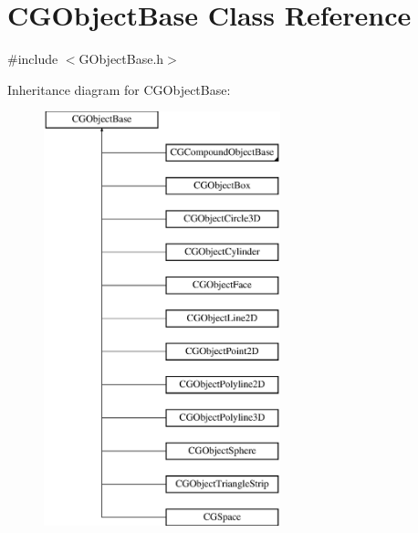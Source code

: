\hypertarget{class_c_g_object_base}{}\section{C\+G\+Object\+Base Class Reference}
\label{class_c_g_object_base}


{\ttfamily \#include $<$G\+Object\+Base.\+h$>$}

Inheritance diagram for C\+G\+Object\+Base\+:\begin{figure}[H]
\begin{center}
\leavevmode
\includegraphics[height=12.000000cm]{class_c_g_object_base}
\end{center}
\end{figure}
